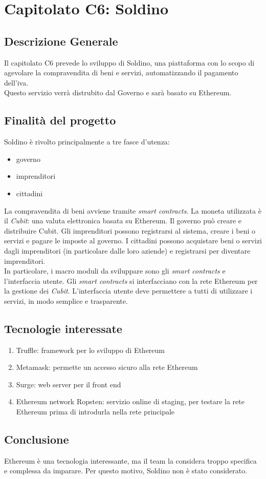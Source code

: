 \chapter{Capitolato C6: Soldino}
\section{Descrizione Generale}

Il capitolato C6 prevede lo sviluppo di Soldino, una piattaforma con lo scopo di agevolare la compravendita di beni e servizi, automatizzando il pagamento dell'iva.\\
Questo servizio verrà distrubito dal Governo e sarà basato su Ethereum. 


\section{Finalit\`a del progetto}
Soldino è rivolto principalmente a tre fasce d'utenza:
\begin{itemize}
	\item governo
	\item imprenditori
	\item cittadini
\end{itemize}
La compravendita di beni avviene tramite \textit{smart contracts}. La moneta utilizzata è il \textit{Cubit}: una valuta elettronica basata su Ethereum.
Il governo può creare e distribuire Cubit. Gli imprenditori possono registrarsi al sistema, creare i beni o servizi e pagare le imposte al governo. I cittadini possono acquistare beni o servizi dagli imprenditori (in particolare dalle loro aziende) e registrarsi per diventare imprenditori.\\
In particolare, i macro moduli da sviluppare sono gli \textit{smart contracts} e l'interfaccia utente. Gli \textit{smart contracts} si interfacciano con la rete Ethereum per la gestione dei \textit{Cubit}. L'interfaccia utente deve permettere a tutti di utilizzare i servizi, in modo semplice e trasparente.


\section{Tecnologie interessate}
\begin{enumerate}
	\item Truffle: framework per lo sviluppo di Ethereum
	\item Metamask: permette un accesso sicuro alla rete Ethereum
	\item Surge: web server per il front end
	\item Ethereum network Ropsten: servizio online di staging, per testare la rete Ethereum prima di introdurla nella rete principale
	
\end{enumerate}
\section{Conclusione}
Ethereum è una tecnologia interessante, ma il team la considera troppo specifica e complessa da imparare. Per questo motivo, Soldino non è stato considerato. 